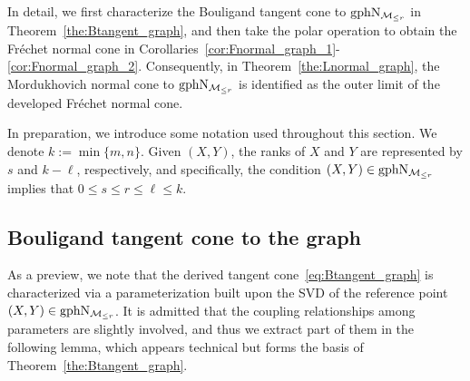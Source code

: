\vspace{-4mm}
\noindent In detail, we first characterize the Bouligand tangent cone to $\mathrm{gph}\mathrm{N}_{\mathcal{M}_{\le r}}$ in Theorem~\ref{the:Btangent_graph}, and then take the polar operation to obtain the Fr\'echet normal cone in Corollaries~\ref{cor:Fnormal_graph_1}-\ref{cor:Fnormal_graph_2}. Consequently, in Theorem~\ref{the:Lnormal_graph}, the Mordukhovich normal cone to $\mathrm{gph}\mathrm{N}_{\mathcal{M}_{\le r}}$ is identified as the outer limit of the developed Fr\'echet normal cone. 

In preparation, we introduce some notation used throughout this section. We denote $k:=\min\{m,n\}$. Given $(X,Y)$, the ranks of $X$ and $Y$ are represented by $s$ and $k-\ell$, respectively, and specifically, the condition $(X,Y)\in\mathrm{gph}\mathrm{N}_{\mathcal{M}_{\le r}}$ implies that $0\le s\le r \le \ell \le k$.


\subsection{Bouligand tangent cone to the graph}
As a preview, we note that the derived tangent cone~\eqref{eq:Btangent_graph} is characterized via a parameterization built upon the SVD of the reference point $(X,Y)\in\mathrm{gph}\mathrm{N}_{\mathcal{M}_{\le r}}$. It is admitted that the coupling relationships among parameters are slightly involved, and thus we extract part of them in the following lemma, which appears technical but forms the basis of Theorem~\ref{the:Btangent_graph}.

